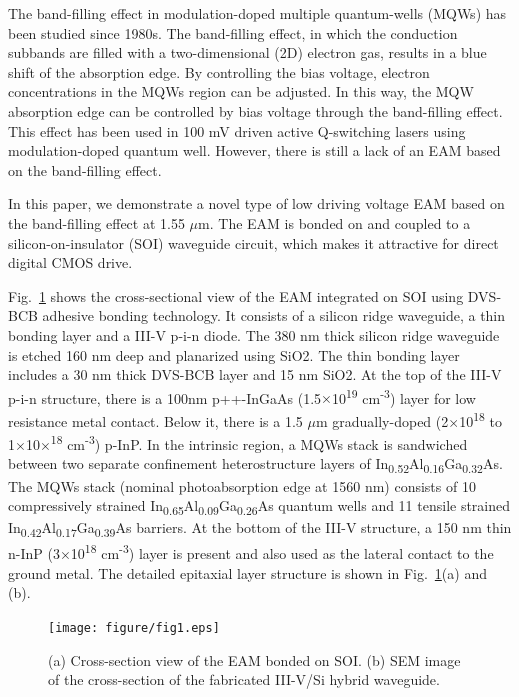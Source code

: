 \documentclass[aip,apl,reprint,a4paper]{revtex4-1}
\def\SP#1{\textsuperscript{#1}}
\def\SB#1{\textsubscript{#1}}
\begin{document}
The band-filling effect in modulation-doped multiple quantum-wells (MQWs) has been studied since 1980s.\cite{livescu1988free} The band-filling effect, in which the conduction subbands are filled with a two-dimensional (2D) electron gas, results in a blue shift of the absorption edge. By controlling the bias voltage, electron concentrations in the MQWs region can be adjusted. In this way, the MQW absorption edge can be controlled by bias voltage through the band-filling effect. This effect has been used in 100 mV driven active Q-switching lasers using modulation-doped quantum well.\cite{kalinovsky1993free} However, there is still a lack of an EAM based on the band-filling effect.


In this paper, we demonstrate a novel type of low driving voltage EAM based on the band-filling effect at 1.55 $\mu$m. The EAM is bonded on and coupled to a silicon-on-insulator (SOI) waveguide circuit, which makes it attractive for direct digital CMOS drive.


Fig.~\ref{fig:1} shows the cross-sectional view of the EAM integrated on SOI using DVS-BCB adhesive bonding technology.\cite{roelkensiii-v-on-silicon2015} It consists of a silicon ridge waveguide, a thin bonding layer and a III-V p-i-n diode. The 380 nm thick silicon ridge waveguide is etched 160 nm deep and planarized using SiO2. The thin bonding layer includes a 30 nm thick DVS-BCB layer and 15 nm SiO2. At the top of the III-V p-i-n structure, there is a 100nm p++-InGaAs (1.5$\times$10\SP{19} cm\SP{-3}) layer for low resistance metal contact. Below it, there is a 1.5 $\mu$m gradually-doped (2$\times$10\SP{18} to 1$\times$10$\times$\SP{18} cm\SP{-3}) p-InP. In the intrinsic region, a MQWs stack is sandwiched between two separate confinement heterostructure layers of In\SB{0.52}Al\SB{0.16}Ga\SB{0.32}As. The MQWs stack (nominal photoabsorption edge at 1560 nm) consists of 10 compressively strained In\SB{0.65}Al\SB{0.09}Ga\SB{0.26}As quantum wells and 11 tensile strained In\SB{0.42}Al\SB{0.17}Ga\SB{0.39}As barriers. At the bottom of the III-V structure, a 150 nm thin n-InP (3$\times$10\SP{18} cm\SP{-3}) layer is present and also used as the lateral contact to the ground metal.  The detailed epitaxial layer structure is shown in Fig.~\ref{fig:1}(a) and (b).

\begin{figure}
	\texttt{[image: figure/fig1.eps]}%
	\caption{\label{fig:1} (a) Cross-section view of the EAM bonded on SOI. (b) SEM image of the cross-section of the fabricated III-V/Si hybrid waveguide.}
\end{figure}
\end{document}
